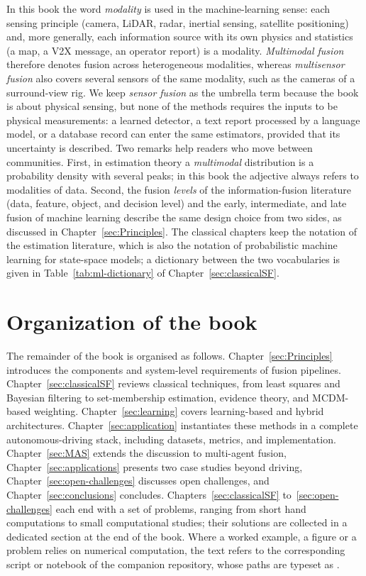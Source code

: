 \begin{addedblock}
In this book the word \emph{modality} is used in the machine-learning sense: each sensing principle (camera, LiDAR, radar, inertial sensing, satellite positioning) and, more generally, each information source with its own physics and statistics (a map, a V2X message, an operator report) is a modality. \emph{Multimodal fusion} therefore denotes fusion across heterogeneous modalities, whereas \emph{multisensor fusion} also covers several sensors of the same modality, such as the cameras of a surround-view rig. We keep \emph{sensor fusion} as the umbrella term because the book is about physical sensing, but none of the methods requires the inputs to be physical measurements: a learned detector, a text report processed by a language model, or a database record can enter the same estimators, provided that its uncertainty is described. Two remarks help readers who move between communities. First, in estimation theory a \emph{multimodal} distribution is a probability density with several peaks; in this book the adjective always refers to modalities of data. Second, the fusion \emph{levels} of the information-fusion literature (data, feature, object, and decision level) and the early, intermediate, and late fusion of machine learning describe the same design choice from two sides, as discussed in Chapter~\ref{sec:Principles}. The classical chapters keep the notation of the estimation literature, which is also the notation of probabilistic machine learning for state-space models; a dictionary between the two vocabularies is given in Table~\ref{tab:ml-dictionary} of Chapter~\ref{sec:classicalSF}.
\end{addedblock}

\section{Organization of the book}

The remainder of the book is organised as follows. Chapter~\ref{sec:Principles} introduces the components and system-level requirements of fusion pipelines. Chapter~\ref{sec:classicalSF} reviews classical techniques, from least squares and Bayesian filtering to set-membership estimation, evidence theory, and MCDM-based weighting. Chapter~\ref{sec:learning} covers learning-based and hybrid architectures. Chapter~\ref{sec:application} instantiates these methods in a complete autonomous-driving stack, including datasets, metrics, and implementation. Chapter~\ref{sec:MAS} extends the discussion to multi-agent fusion, Chapter~\ref{sec:applications} presents two case studies beyond driving, Chapter~\ref{sec:open-challenges} discusses open challenges, and Chapter~\ref{sec:conclusions} concludes.
Chapters~\ref{sec:classicalSF} to~\ref{sec:open-challenges} each end with a set of problems, ranging from short hand computations to small computational studies; their solutions are collected in a dedicated section at the end of the book. Where a worked example, a figure or a problem relies on numerical computation, the text refers to the corresponding script or notebook of the companion repository, whose paths are typeset as .

%
%
